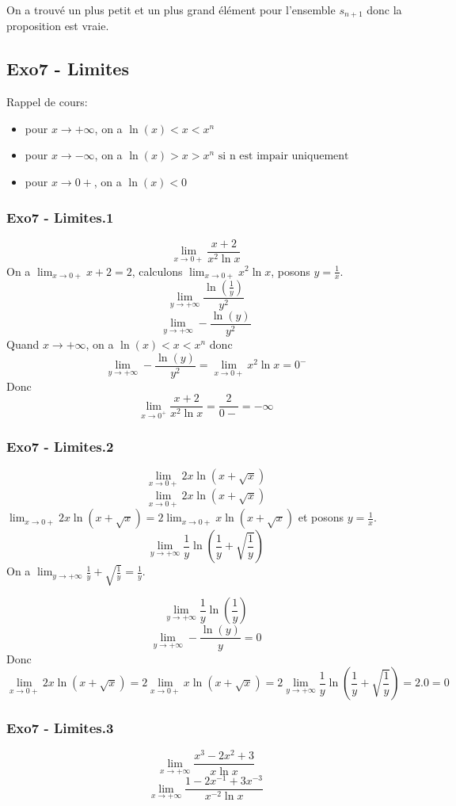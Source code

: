 \documentclass[]{book}
\theoremstyle{definition}
\begin{document}
On a trouv\'e un plus petit et un plus grand \'el\'ement pour l'ensemble $s_{n+1}$ donc la proposition est vraie.
 
\newpage
\subsection*{Exo7 - Limites}
Rappel de cours:
\begin{itemize}
\item pour $x \to +\infty$, on a $\ln(x) < x < x^n$
\item pour $x \to -\infty$, on a $\ln(x) > x > x^n \textrm{ si n est impair uniquement}$
\item pour $x \to 0+$, on a $\ln(x) < 0$
\end{itemize}

\subsubsection*{Exo7 - Limites.1}
$$\lim_{x \to 0+} \frac{x+2}{x^2\ln x}$$
On a $\lim_{x \to 0+} x+2 = 2$, calculons $\lim_{x \to 0+}x^2\ln x$, posons $y = \frac{1}{x}$.\
$$\lim_{y \to +\infty}\frac{\ln(\frac{1}{y})}{y^2}$$
$$\lim_{y \to +\infty}-\frac{\ln(y)}{y^2}$$
Quand $x \to +\infty$, on a $\ln(x) < x < x^n$ donc
$$\lim_{y \to +\infty}-\frac{\ln(y)}{y^2} = \lim_{x \to 0+}x^2\ln x = 0^{-}$$
Donc 
$$\lim_{x \to 0^{+}} \frac{x+2}{x^2\ln x} = \frac{2}{0-} = -\infty$$

\subsubsection*{Exo7 - Limites.2}
$$\lim_{x \to 0+} 2x\ln(x+\sqrt{x})$$
$$\lim_{x \to 0+} 2x\ln(x+\sqrt{x})$$
$\lim_{x \to 0+} 2x\ln(x+\sqrt{x}) = 2 \lim_{x \to 0+} x\ln(x+\sqrt{x})$ et posons $y = \frac{1}{x}$.
$$\lim_{y \to +\infty}\frac{1}{y}\ln(\frac{1}{y} + \sqrt{\frac{1}{y}})$$
On a $\lim_{y \to +\infty} \frac{1}{y} + \sqrt{\frac{1}{y}} = \frac{1}{y}$.

$$\lim_{y \to +\infty}\frac{1}{y}\ln(\frac{1}{y})$$
$$\lim_{y \to +\infty}-\frac{\ln(y)}{y} = 0$$
Donc
$$\lim_{x \to 0+} 2x\ln(x+\sqrt{x}) = 2 \lim_{x \to 0+} x\ln(x+\sqrt{x}) = 2\lim_{y \to +\infty}\frac{1}{y}\ln(\frac{1}{y} + \sqrt{\frac{1}{y}}) = 2.0 = 0$$


\subsubsection*{Exo7 - Limites.3}
$$\lim_{x \to +\infty} \frac{x^3-2x^2+3}{x\ln x}$$
$$\lim_{x \to +\infty} \frac{1-2x^{-1}+3x^{-3}}{x^{-2}\ln x}$$
\end{document}
